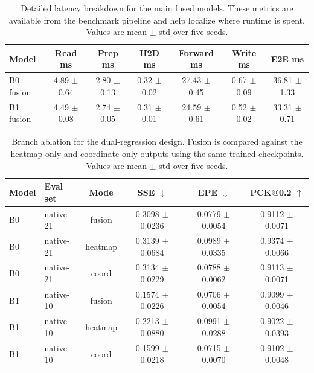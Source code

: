 \documentclass[10pt,letterpaper]{article}
\begin{document}
\begin{table}[H]
\centering
\footnotesize
\caption{Detailed latency breakdown for the main fused models. These metrics are available from the benchmark pipeline and help localize where runtime is spent. Values are mean $\pm$ std over five seeds.}
\label{tab:latency_breakdown}
\begin{tabular}{lcccccc}
\toprule
Model & Read ms & Prep ms & H2D ms & Forward ms & Write ms & E2E ms \\
\midrule
B0 fusion & 4.89 $\pm$ 0.64 & 2.80 $\pm$ 0.13 & 0.32 $\pm$ 0.02 & 27.43 $\pm$ 0.45 & 0.67 $\pm$ 0.09 & 36.81 $\pm$ 1.33 \\
B1 fusion & 4.49 $\pm$ 0.08 & 2.74 $\pm$ 0.05 & 0.31 $\pm$ 0.01 & 24.59 $\pm$ 0.61 & 0.52 $\pm$ 0.02 & 33.31 $\pm$ 0.71 \\
\bottomrule
\end{tabular}
\end{table}

\begin{table}[H]
\centering
\footnotesize
\caption{Branch ablation for the dual-regression design. Fusion is compared against the heatmap-only and coordinate-only outputs using the same trained checkpoints. Values are mean $\pm$ std over five seeds.}
\label{tab:branch_ablation}
\begin{tabular}{llcccc}
\toprule
Model & Eval set & Mode & SSE $\downarrow$ & EPE $\downarrow$ & PCK@0.2 $\uparrow$ \\
\midrule
B0 & native-21 & fusion & 0.3098 $\pm$ 0.0236 & 0.0779 $\pm$ 0.0054 & 0.9112 $\pm$ 0.0071 \\
B0 & native-21 & heatmap & 0.3139 $\pm$ 0.0684 & 0.0989 $\pm$ 0.0335 & 0.9374 $\pm$ 0.0066 \\
B0 & native-21 & coord & 0.3134 $\pm$ 0.0229 & 0.0788 $\pm$ 0.0062 & 0.9113 $\pm$ 0.0071 \\
B1 & native-10 & fusion & 0.1574 $\pm$ 0.0226 & 0.0706 $\pm$ 0.0054 & 0.9099 $\pm$ 0.0046 \\
B1 & native-10 & heatmap & 0.2213 $\pm$ 0.0880 & 0.0991 $\pm$ 0.0288 & 0.9022 $\pm$ 0.0393 \\
B1 & native-10 & coord & 0.1599 $\pm$ 0.0218 & 0.0715 $\pm$ 0.0070 & 0.9102 $\pm$ 0.0048 \\
\bottomrule
\end{tabular}
\end{table}
\end{document}
